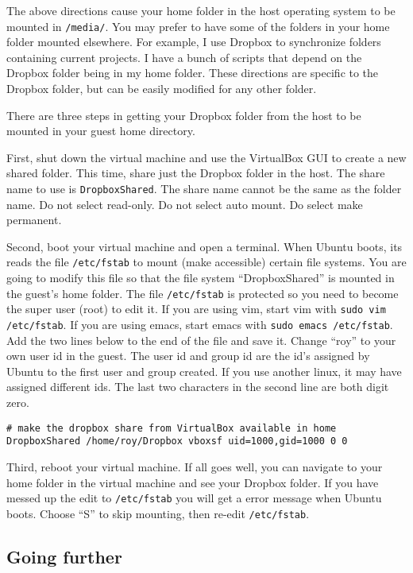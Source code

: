 \documentclass{article}
\let\code\texttt %
\begin{document}
The above directions cause your home folder in the host operating system
to be mounted in \code{/media/}. You may prefer to have some of the
folders in your home folder mounted elsewhere. For example, I use
Dropbox to synchronize folders containing current projects. I have a
bunch of scripts that depend on the Dropbox folder being in my home
folder. These directions are specific to the Dropbox folder, but can be
easily modified for any other folder.

There are three steps in getting your Dropbox folder from the host to be
mounted in your guest home directory.

First, shut down the virtual machine and use the VirtualBox GUI to
create a new shared folder. This time, share just the Dropbox folder in
the host. The share name to use is \code{DropboxShared}. The share name
cannot be the same as the folder name. Do not select read-only. Do not
select auto mount. Do select make permanent.

Second, boot your virtual machine and open a terminal. When Ubuntu
boots, its reads the file \code{/etc/fstab} to mount (make accessible)
certain file systems. You are going to modify this file so that the file
system ``DropboxShared'' is mounted in the guest's home folder. The file
\code{/etc/fstab} is protected so you need to become the super user
(root) to edit it. If you are using vim, start vim with \code{sudo vim
/etc/fstab}. If you are using emacs, start emacs with \code{sudo emacs
/etc/fstab}. Add the two lines below to the end of the file and
save it. Change ``roy'' to your own user id in the guest. The user id
and group id are the id's assigned by Ubuntu to the first user and group
created. If you use another linux, it may have assigned different ids. 
The last two characters  in the second line are both digit zero.

\begin{verbatim}
# make the dropbox share from VirtualBox available in home
DropboxShared /home/roy/Dropbox vboxsf uid=1000,gid=1000 0 0
\end{verbatim}

Third, reboot your virtual machine. If all goes well, you can navigate
to your home folder in the virtual machine and see your Dropbox folder.
If you have messed up the edit to \code{/etc/fstab} you will get a
error message when Ubuntu boots. Choose ``S'' to skip mounting, then
re-edit \code{/etc/fstab}.

\subsection{Going further}
\end{document}
